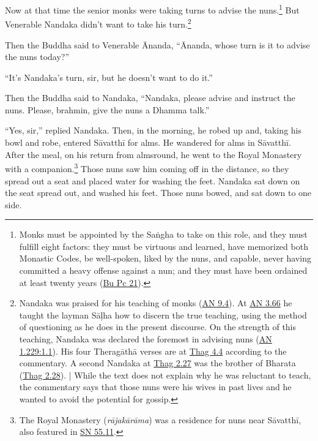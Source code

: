\documentclass[12pt,openany]{book}%
\begin{document}
Now at that time the senior monks were taking turns to advise the nuns.\footnote{Monks must be appointed by the \textsanskrit{Saṅgha} to take on this role, and they must fulfill eight factors: they must be virtuous and learned, have memorized both Monastic Codes, be well-spoken, liked by the nuns, and capable, never having committed a heavy offense against a nun; and they must have been ordained at least twenty years (\href{https://suttacentral.net/pli-tv-bu-vb-pc21/en/sujato}{Bu Pc 21}). } But Venerable Nandaka didn’t want to take his turn.\footnote{Nandaka was praised for his teaching of monks (\href{https://suttacentral.net/an9.4/en/sujato}{AN 9.4}). At \href{https://suttacentral.net/an3.66/en/sujato}{AN 3.66} he taught the layman \textsanskrit{Sāḷha} how to discern the true teaching, using the method of questioning as he does in the present discourse. On the strength of this teaching, Nandaka was declared the foremost in advising nuns (\href{https://suttacentral.net/an1.229/en/sujato\#1.1}{AN 1.229:1.1}). His four \textsanskrit{Theragāthā} verses are at \href{https://suttacentral.net/thag4.4/en/sujato}{Thag 4.4} according to the commentary. A second Nandaka at \href{https://suttacentral.net/thag2.27/en/sujato}{Thag 2.27} was the brother of Bharata (\href{https://suttacentral.net/thag2.28/en/sujato}{Thag 2.28}). | While the text does not explain why he was reluctant to teach, the commentary says that those nuns were his wives in past lives and he wanted to avoid the potential for gossip. } 

Then the Buddha said to Venerable Ānanda, “Ānanda, whose turn is it to advise the nuns today?” 

“It’s Nandaka’s turn, sir, but he doesn’t want to do it.” 

Then the Buddha said to Nandaka, “Nandaka, please advise and instruct the nuns. Please, brahmin, give the nuns a Dhamma talk.” 

“Yes, sir,” replied Nandaka. Then, in the morning, he robed up and, taking his bowl and robe, entered \textsanskrit{Sāvatthī} for alms. He wandered for alms in \textsanskrit{Sāvatthī}. After the meal, on his return from almsround, he went to the Royal Monastery with a companion.\footnote{The Royal Monastery (\textit{\textsanskrit{rājakārāma}}) was a residence for nuns near \textsanskrit{Sāvatthī}, also featured in \href{https://suttacentral.net/sn55.11/en/sujato}{SN 55.11}. } Those nuns saw him coming off in the distance, so they spread out a seat and placed water for washing the feet. Nandaka sat down on the seat spread out, and washed his feet. Those nuns bowed, and sat down to one side. 
\end{document}
